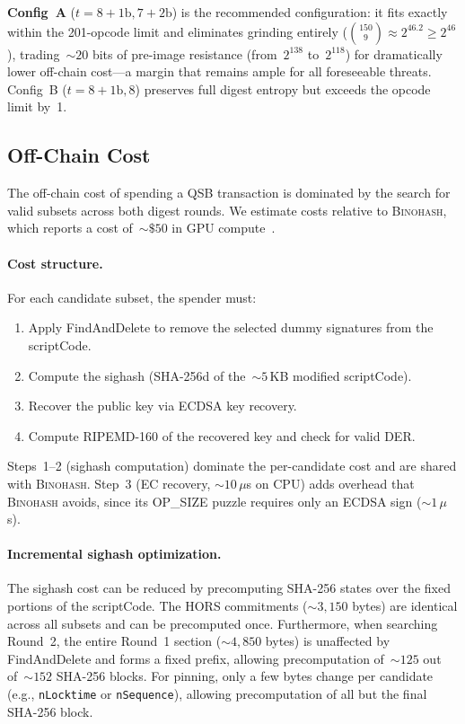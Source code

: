 \documentclass[11pt, a4paper]{article}
\begin{document}
\noindent \textbf{Config~A} ($t = 8{+}1\mathrm{b}, 7{+}2\mathrm{b}$) is the recommended configuration: it fits exactly within the 201-opcode limit and eliminates grinding entirely ($\binom{150}{9} \approx 2^{46.2} \geq 2^{46}$), trading~${\sim}20$ bits of pre-image resistance (from~$2^{138}$ to~$2^{118}$) for dramatically lower off-chain cost---a margin that remains ample for all foreseeable threats. Config~B ($t = 8{+}1\mathrm{b}, 8$) preserves full digest entropy but exceeds the opcode limit by~1.

\subsection{Off-Chain Cost}
\label{sec:offchain-cost}

The off-chain cost of spending a QSB transaction is dominated by the search for valid subsets across both digest rounds. We estimate costs relative to \textsc{Binohash}, which reports a cost of~${\sim}\$50$ in GPU compute~\cite{linus2024binohash}.

\paragraph{Cost structure.}
For each candidate subset, the spender must:
\begin{enumerate}
    \item Apply FindAndDelete to remove the selected dummy signatures from the scriptCode.
    \item Compute the sighash (SHA-256d of the~${\sim}5$\,KB modified scriptCode).
    \item Recover the public key via ECDSA key recovery.
    \item Compute RIPEMD-160 of the recovered key and check for valid DER.
\end{enumerate}

Steps~1--2 (sighash computation) dominate the per-candidate cost and are shared with \textsc{Binohash}. Step~3 (EC recovery, ${\sim}10\,\mu$s on CPU) adds overhead that \textsc{Binohash} avoids, since its OP\_SIZE puzzle requires only an ECDSA sign (${\sim}1\,\mu$s).

\paragraph{Incremental sighash optimization.}
The sighash cost can be reduced by precomputing SHA-256 states over the fixed portions of the scriptCode. The HORS commitments (${\sim}3{,}150$ bytes) are identical across all subsets and can be precomputed once. Furthermore, when searching Round~2, the entire Round~1 section (${\sim}4{,}850$ bytes) is unaffected by FindAndDelete and forms a fixed prefix, allowing precomputation of~${\sim}125$ out of~${\sim}152$ SHA-256 blocks. For pinning, only a few bytes change per candidate (e.g., \texttt{nLocktime} or \texttt{nSequence}), allowing precomputation of all but the final SHA-256 block.
\end{document}
